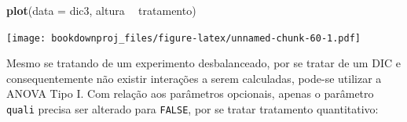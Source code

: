 \documentclass[
]{article}
\newenvironment{Shaded}{\begin{snugshade}}{\end{snugshade}}
\newcommand{\DataTypeTok}[1]{\textcolor[rgb]{0.13,0.29,0.53}{#1}}
\newcommand{\KeywordTok}[1]{\textcolor[rgb]{0.13,0.29,0.53}{\textbf{#1}}}
\newcommand{\NormalTok}[1]{#1}
\newcommand{\OperatorTok}[1]{\textcolor[rgb]{0.81,0.36,0.00}{\textbf{#1}}}
\newcommand{\OtherTok}[1]{\textcolor[rgb]{0.56,0.35,0.01}{#1}}
\newcommand{\StringTok}[1]{\textcolor[rgb]{0.31,0.60,0.02}{#1}}
\begin{document}
\begin{Shaded}
\begin{Highlighting}[]
\KeywordTok{plot}\NormalTok{(}\DataTypeTok{data =}\NormalTok{ dic3, altura }\OperatorTok{~}\StringTok{ }\NormalTok{tratamento)}
\end{Highlighting}
\end{Shaded}

\texttt{[image: bookdownproj\_files/figure-latex/unnamed-chunk-60-1.pdf]}

Mesmo se tratando de um experimento desbalanceado, por se tratar de um DIC e consequentemente não existir interações a serem calculadas, pode-se utilizar a ANOVA Tipo I. Com relação aos parâmetros opcionais, apenas o parâmetro \texttt{quali} precisa ser alterado para \texttt{FALSE}, por se tratar tratamento quantitativo:

\begin{Shaded}
\end{Shaded}
\end{document}
